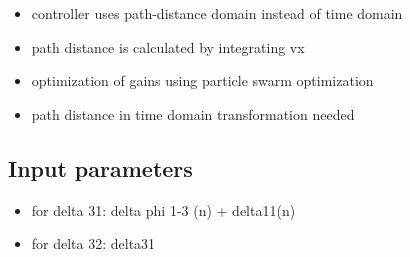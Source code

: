 \documentclass[ExampleMasters.tex]{subfiles}
\begin{document}
\begin{itemize}
	\item controller uses path-distance domain instead of time domain
\item path distance is calculated by integrating vx
\item optimization of gains using particle swarm optimization
\item path distance in time domain transformation needed
\end{itemize}

\subsection{Input parameters}
\label{sec:input_parameters_LS}

\begin{itemize}
	\item for delta 31: delta phi 1-3 (n) + delta11(n)
	\item for delta 32: delta31
\end{itemize}
\end{document}
